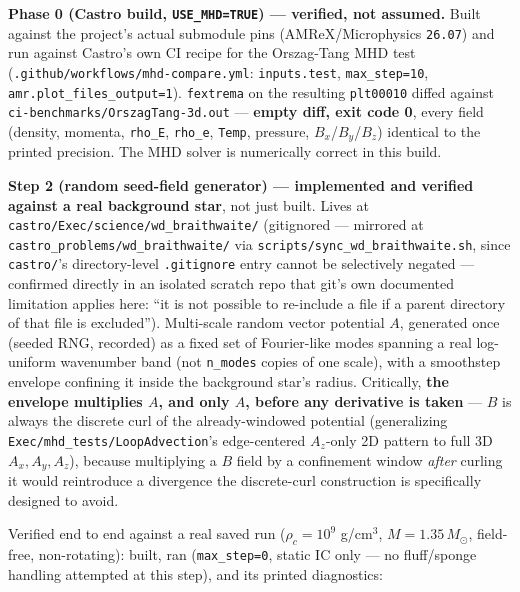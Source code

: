 \documentclass[11pt,a4paper]{scrartcl}
\newcommand{\code}[1]{\texttt{\small #1}}
\begin{document}
\textbf{Phase 0 (Castro build, \code{USE\_MHD=TRUE}) --- verified, not
assumed.} Built against the project's actual submodule pins
(AMReX/Microphysics \code{26.07}) and run against Castro's own CI
recipe for the Orszag-Tang MHD test
(\code{.github/workflows/mhd-compare.yml}: \code{inputs.test},
\code{max\_step=10}, \code{amr.plot\_files\_output=1}). \code{fextrema}
on the resulting \code{plt00010} diffed against
\code{ci-benchmarks/OrszagTang-3d.out} --- \textbf{empty diff, exit code
0}, every field (density, momenta, \code{rho\_E}, \code{rho\_e},
\code{Temp}, pressure, $B_x$/$B_y$/$B_z$) identical to the printed
precision. The MHD solver is numerically correct in this build.

\textbf{Step 2 (random seed-field generator) --- implemented and
verified against a real background star}, not just built. Lives at
\code{castro/Exec/science/wd\_braithwaite/} (gitignored --- mirrored at
\code{castro\_problems/wd\_braithwaite/} via
\code{scripts/sync\_wd\_braithwaite.sh}, since \code{castro/}'s
directory-level \code{.gitignore} entry cannot be selectively negated
--- confirmed directly in an isolated scratch repo that git's own
documented limitation applies here: ``it is not possible to re-include
a file if a parent directory of that file is excluded''). Multi-scale
random vector potential $A$, generated once (seeded RNG, recorded) as a
fixed set of Fourier-like modes spanning a real log-uniform wavenumber
band (not \code{n\_modes} copies of one scale), with a smoothstep
envelope confining it inside the background star's radius. Critically,
\textbf{the envelope multiplies $A$, and only $A$, before any
derivative is taken} --- $B$ is always the discrete curl of the
already-windowed potential (generalizing
\code{Exec/mhd\_tests/LoopAdvection}'s edge-centered $A_z$-only 2D
pattern to full 3D $A_x,A_y,A_z$), because multiplying a $B$ field by a
confinement window \emph{after} curling it would reintroduce a
divergence the discrete-curl construction is specifically designed to
avoid.

Verified end to end against a real saved run ($\rho_c=10^9$ g/cm$^3$,
$M=1.35\,M_\odot$, field-free, non-rotating): built, ran
(\code{max\_step=0}, static IC only --- no fluff/sponge handling
attempted at this step), and its printed diagnostics:
\end{document}
